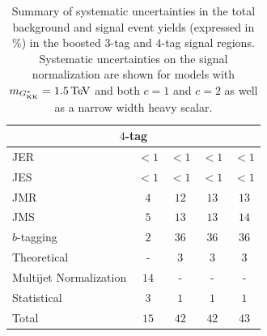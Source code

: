 \begin{table}[ht!]
\begin{center}
\begin{tabular}{  l  c  c  c  c }
\bottomrule
                \multicolumn{5}{c}{$4$-tag}  \\
\midrule
   JER           &  $< 1$    &  $<1$  &  $<1$   & $<1$ \\
   JES           &  $< 1$    &  $<1$    &  $<1$    & $<1$ \\
   JMR           &  $4$    &   $12$   &  $13$   & $13$  \\
   JMS           &  $5$    &  $13$   &  $13$   & $14$  \\
   $b$-tagging   &  $2$    &  $36$   &  $36$   & $36$  \\
   Theoretical   &  -      &  $3$    &  $3$    & $3$ \\
   Multijet Normalization      &  $14$  &  -      &  -      &  -  \\
   Statistical    &  $3$    &  $1$      &  $1$      &  $1$  \\
   \midrule
   Total         &  $15$   &  $42$   &  $42$   & $43$ \\
\bottomrule
\end{tabular}
\caption{Summary of systematic uncertainties in the total background and signal event yields (expressed in $\%$) in the boosted $3$-tag and $4$-tag signal regions. Systematic uncertainties on the signal normalization are shown for models with $m_{\Gkk} = 1.5 \TeV$ and both $c = 1$ and $c = 2$ as well as a narrow width heavy scalar.
}
\label{tab:BoostedSyst}
\end{center}
\end{table}

